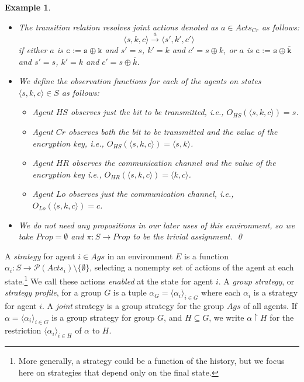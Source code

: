 \documentclass[a4wide]{article}
\newcommand{\ptrans}[1]{\stackrel{#1}{\longrightarrow}}
\newcommand{\Prop}{Prop}
\theoremstyle{examplesty}
\newtheorem{example}{Example}
\newcommand{\Ags}{\mathit{Ags}}
\newcommand{\Env}{E}
\newcommand{\restrict}{\upharpoonright}
\newcommand{\Acts}{\mathit{Acts}}
\newcommand{\sgy}{\alpha}
\newcommand{\Crypt}{Cr}
\newcommand{\Low}{Lo}
\begin{document}
\begin{example}
\begin{itemize}
\item The transition relation resolves joint actions denoted as $a\in \Acts_{\Crypt}$ as follows: 
$$\langle s,k,c\rangle \ptrans{a} \langle s',k',c'\rangle$$ 
if either $a$ is $\mathtt{c}:=\mathtt{s} \oplus \mathtt{k}$ and $s' = s$, $k'=k$ and $c' = s\oplus k$, 
or  $a$ is $\mathtt{c}:=\mathtt{s} \oplus \overline{\mathtt{k}}$ and $s' = s$, $k'=k$ and $c' = s\oplus \overline{k}$. 

\item We define the observation functions for each of the agents on states $\langle s,k,c\rangle\in S$ as follows: 
\begin{itemize} 
\item Agent $HS$ observes just the bit to be transmitted, i.e., $O_{HS}(\langle s,k,c\rangle) = s$. 
\item Agent $\Crypt$ observes both the bit to be transmitted and the value of the encryption key, i.e., $O_{HS}(\langle s,k,c\rangle) = \langle s,k\rangle$. 
\item Agent $HR$ observes the communication channel and the value of the encryption key  i.e., $O_{HR}(\langle s,k,c\rangle) = \langle k,c\rangle$. 
\item Agent $\Low$ observes just the communication channel,  i.e., $O_{\Low}(\langle s,k,c\rangle) = c$. 
\end{itemize} 

\item  We do not need any propositions in our later uses of this environment, 
so we take $\Prop = \emptyset$ and $\pi : S\rightarrow \Prop$ to be the trivial assignment. \qed
\end{itemize} 

\end{example} 




A {\em strategy} for agent $i\in \Ags$ in an environment $\Env$
is a function $\sgy_i: S \rightarrow \mathcal{ P}(\Acts_i) \setminus \{ \emptyset\}$, 
selecting a 
nonempty 
set of actions of the agent at each state.\footnote{More generally, 
a strategy could be a function of the history, but we focus here
on strategies that depend only on the final state.} 
We call these 
actions
{\em enabled} at the state
for agent $i$. 
A {\em group strategy}, or {\em strategy profile}, for a group $G$ is a 
tuple $\sgy_G = \langle \sgy_i\rangle_{i \in G}$ where each $\sgy_i$ is a strategy for agent $i$. 
A \emph{joint} strategy is a group strategy for the group $\Ags$ of all agents. 
If $\sgy= \langle \sgy_i\rangle_{i \in G}$ is a group strategy for group $G$, and $H\subseteq G$, we write 
$\sgy\restrict H$ for the restriction $ \langle \sgy_i\rangle_{i \in H}$ of $\sgy$ to $H$. 
\end{document}
